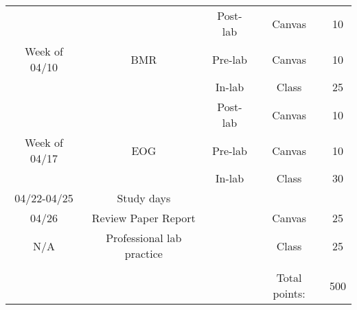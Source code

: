 \documentclass{article}
\begin{document}
\begin{table}[h!]
\begin{tabular}[h!]{ccccc}
		& & Post-lab & Canvas & 10\\
	Week of 04/10 & BMR & Pre-lab & Canvas & 10\\
		& & In-lab & Class & 25\\
		& & Post-lab & Canvas & 10\\
	Week of 04/17 & EOG & Pre-lab & Canvas & 10\\
		& & In-lab & Class & 30\\
	\midrule
	04/22-04/25 & Study days & &\\
	\midrule
	04/26 & Review Paper Report & & Canvas & 25\\
	N/A & Professional lab practice & & Class & 25\\
	\bottomrule
	\\
	& & & Total points: & 500\\
\end{tabular}
\end{table}
\end{document}
